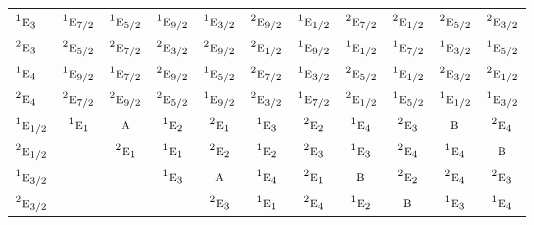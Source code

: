 \documentclass[10pt,a4paper]{article}
\numberwithin{equation}{section}
\newcommand{\irr}[1]{\text{\normalfont\scshape #1}}
\newcommand{\conjpair}[1]{{}^{#1}}
\begin{document}
{\begin{longtable}{@{}lcccccccccc@{}}
$\conjpair{1}\irr{e}_{3}$ & $\conjpair{1}\irr{e}_{7/2}$ & $\conjpair{1}\irr{e}_{5/2}$ & $\conjpair{1}\irr{e}_{9/2}$ & $\conjpair{1}\irr{e}_{3/2}$ & $\conjpair{2}\irr{e}_{9/2}$ & $\conjpair{1}\irr{e}_{1/2}$ & $\conjpair{2}\irr{e}_{7/2}$ & $\conjpair{2}\irr{e}_{1/2}$ & $\conjpair{2}\irr{e}_{5/2}$ & $\conjpair{2}\irr{e}_{3/2}$\\
$\conjpair{2}\irr{e}_{3}$ & $\conjpair{2}\irr{e}_{5/2}$ & $\conjpair{2}\irr{e}_{7/2}$ & $\conjpair{2}\irr{e}_{3/2}$ & $\conjpair{2}\irr{e}_{9/2}$ & $\conjpair{2}\irr{e}_{1/2}$ & $\conjpair{1}\irr{e}_{9/2}$ & $\conjpair{1}\irr{e}_{1/2}$ & $\conjpair{1}\irr{e}_{7/2}$ & $\conjpair{1}\irr{e}_{3/2}$ & $\conjpair{1}\irr{e}_{5/2}$\\
$\conjpair{1}\irr{e}_{4}$ & $\conjpair{1}\irr{e}_{9/2}$ & $\conjpair{1}\irr{e}_{7/2}$ & $\conjpair{2}\irr{e}_{9/2}$ & $\conjpair{1}\irr{e}_{5/2}$ & $\conjpair{2}\irr{e}_{7/2}$ & $\conjpair{1}\irr{e}_{3/2}$ & $\conjpair{2}\irr{e}_{5/2}$ & $\conjpair{1}\irr{e}_{1/2}$ & $\conjpair{2}\irr{e}_{3/2}$ & $\conjpair{2}\irr{e}_{1/2}$\\
$\conjpair{2}\irr{e}_{4}$ & $\conjpair{2}\irr{e}_{7/2}$ & $\conjpair{2}\irr{e}_{9/2}$ & $\conjpair{2}\irr{e}_{5/2}$ & $\conjpair{1}\irr{e}_{9/2}$ & $\conjpair{2}\irr{e}_{3/2}$ & $\conjpair{1}\irr{e}_{7/2}$ & $\conjpair{2}\irr{e}_{1/2}$ & $\conjpair{1}\irr{e}_{5/2}$ & $\conjpair{1}\irr{e}_{1/2}$ & $\conjpair{1}\irr{e}_{3/2}$\\
$\conjpair{1}\irr{e}_{1/2}$ & $\conjpair{1}\irr{e}_{1}$ & $\irr{a}$ & $\conjpair{1}\irr{e}_{2}$ & $\conjpair{2}\irr{e}_{1}$ & $\conjpair{1}\irr{e}_{3}$ & $\conjpair{2}\irr{e}_{2}$ & $\conjpair{1}\irr{e}_{4}$ & $\conjpair{2}\irr{e}_{3}$ & $\irr{b}$ & $\conjpair{2}\irr{e}_{4}$\\
$\conjpair{2}\irr{e}_{1/2}$ &  & $\conjpair{2}\irr{e}_{1}$ & $\conjpair{1}\irr{e}_{1}$ & $\conjpair{2}\irr{e}_{2}$ & $\conjpair{1}\irr{e}_{2}$ & $\conjpair{2}\irr{e}_{3}$ & $\conjpair{1}\irr{e}_{3}$ & $\conjpair{2}\irr{e}_{4}$ & $\conjpair{1}\irr{e}_{4}$ & $\irr{b}$\\
$\conjpair{1}\irr{e}_{3/2}$ &  &  & $\conjpair{1}\irr{e}_{3}$ & $\irr{a}$ & $\conjpair{1}\irr{e}_{4}$ & $\conjpair{2}\irr{e}_{1}$ & $\irr{b}$ & $\conjpair{2}\irr{e}_{2}$ & $\conjpair{2}\irr{e}_{4}$ & $\conjpair{2}\irr{e}_{3}$\\
$\conjpair{2}\irr{e}_{3/2}$ &  &  &  & $\conjpair{2}\irr{e}_{3}$ & $\conjpair{1}\irr{e}_{1}$ & $\conjpair{2}\irr{e}_{4}$ & $\conjpair{1}\irr{e}_{2}$ & $\irr{b}$ & $\conjpair{1}\irr{e}_{3}$ & $\conjpair{1}\irr{e}_{4}$\\

\end{longtable}}
\end{document}
